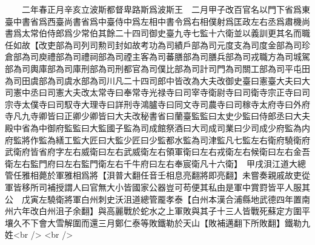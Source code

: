 　　二年春正月辛亥立波斯都督卑路斯爲波斯王　二月甲子改百官名以門下省爲東臺中書省爲西臺尚書省爲中臺侍中爲左相中書令爲右相僕射爲匡政左右丞爲肅機尚書爲太常伯侍郎爲少常伯其餘二十四司御史臺九寺七監十六衛並以義訓更其名而職任如故【改吏部為司列司勲司封如故考功為司績戶部為司元度支為司度金部為司珍倉部為司庾禮部為司禮祠部為司禋主客為司蕃膳部為司膳兵部為司戎職方為司城駕部為司輿庫部為司庫刑部為司刑都官為司僕比部為司計司門為司關工部為司平屯田為司田虞部為司虞水部為司川凡二十四司郎中皆改為大夫改御史臺曰憲臺大夫曰大司憲中丞曰司憲大夫改太常寺曰奉常寺光禄寺曰司宰寺衛尉寺曰司衛寺宗正寺曰司宗寺太僕寺曰司馭寺大理寺曰詳刑寺鴻臚寺曰同文寺司農寺曰司稼寺太府寺曰外府寺凡九寺卿皆曰正卿少卿皆曰大夫改秘書省曰蘭臺監監曰太史少監曰侍郎丞曰大夫殿中省為中御府監監曰大監國子監為司成館祭酒曰大司成司業曰少司成少府監為内府監將作監為繕工監大匠曰大監少匠曰少監都水監為司津監凡七監左右衛府驍衛府武衛府皆省府字左右威衛曰左右武威衛左右領軍衛曰左右戎衛左右候衛曰左右金吾衛左右監門府曰左右監門衛左右千牛府曰左右奉宸衛凡十六衛】　甲戌浿江道大總管任雅相薨於軍雅相爲將【浿普大翻任音壬相息亮翻將即亮翻】未嘗奏親戚故吏從軍皆移所司補授謂人曰官無大小皆國家公器豈可苟便其私由是軍中賞罸皆平人服其公　戊寅左驍衛將軍白州刺史沃沮道總管龎孝泰【白州本漢合浦縣地武德四年置南州六年改白州沮子余翻】與高麗戰於蛇水之上軍敗與其子十三人皆戰死蘇定方圍平壤久不下會大雪解圍而還三月鄭仁泰等敗鐵勒於天山【敗補邁翻下所敗翻】鐵勒九姓<br />
<br />
